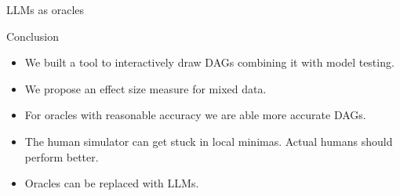 \documentclass{beamer}
\begin{document}
\begin{frame}{LLMs as oracles}
\end{frame}

\begin{frame}{Conclusion}
	\begin{itemize}
		\item We built a tool to interactively draw DAGs combining it with model testing.
		\item We propose an effect size measure for mixed data.
		\item For oracles with reasonable accuracy we are able more accurate DAGs.
		\item The human simulator can get stuck in local minimas. Actual humans should perform better.
		\item Oracles can be replaced with LLMs.
	\end{itemize}
\end{frame}
\end{document}
